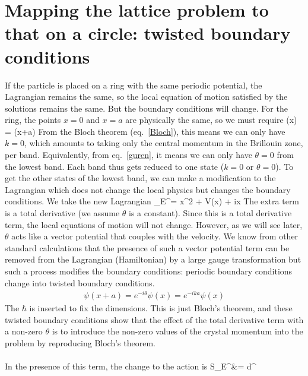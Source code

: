 \documentclass[12pt,onecolumn]{revtex4-2}
\begin{document}
\section{Mapping the lattice problem to that on a circle: twisted boundary conditions}
If the particle is placed on a ring with the same periodic potential, the Lagrangian remains the same, so the local equation of motion satisfied by the solutions remains the same. But the boundary conditions will change. For the ring, the points \(x = 0\) and \(x=a\) are physically the same, so we must require 
\beq
\psi(x) = \psi(x+a)
\eeq
From the Bloch theorem (eq.~\ref{Bloch}), this means we can only have \(k=0\), which amounts to taking only the central momentum in the Brillouin zone, per band. Equivalently, from eq.~\ref{guren}, it means we can only have \(\theta = 0\) from the lowest band. Each band thus gets reduced to one state (\(k=0\) or \(\theta = 0\)). To get the other states of the lowest band, we can make a modification to the Lagrangian which does not change the local physics but changes the boundary conditions. We take the new Lagrangian
\beq[newl]
_E^\prime= \dot x^2 + V(x) + i\dot x
\eeq
The extra term is a total derivative (we assume \(\theta\) is a constant). Since this is a total derivative term, the local equations of motion will not change. However, as we will see later, \(\theta\) acts like a vector potential that couples with the velocity. We know from other standard calculations that the presence of such a vector potential term can be removed from the Lagrangian (Hamiltonian) by a large gauge transformation but such a process modifies the boundary conditions: periodic boundary conditions change into twisted boundary conditions.
\begin{equation}\begin{aligned}
	\psi(x+a) = e^{-i\theta}\psi(x) = e^{-ika}\psi(x)
\end{aligned}\end{equation}
The \(\hbar\) is inserted to fix the dimensions. This is just Bloch's theorem, and these twisted boundary conditions show that the effect of the total derivative term with a non-zero \(\theta\) is to introduce the non-zero values of the crystal momentum into the problem by reproducing Bloch's theorem.\\\\
In the presence of this term, the change to the action is
\beq
S_E^\prime &= \int d\tau^\prime {} \\
\end{document}
